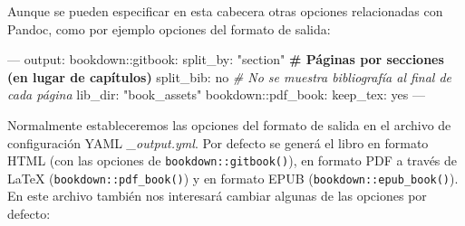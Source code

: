\documentclass[]{book}
\newenvironment{Shaded}{\begin{snugshade}}{\end{snugshade}}
\newcommand{\KeywordTok}[1]{\textcolor[rgb]{0.13,0.29,0.53}{\textbf{#1}}}
\newcommand{\StringTok}[1]{\textcolor[rgb]{0.31,0.60,0.02}{#1}}
\newcommand{\CommentTok}[1]{\textcolor[rgb]{0.56,0.35,0.01}{\textit{#1}}}
\newcommand{\OtherTok}[1]{\textcolor[rgb]{0.56,0.35,0.01}{#1}}
\newcommand{\FunctionTok}[1]{\textcolor[rgb]{0.00,0.00,0.00}{#1}}
\newcommand{\AttributeTok}[1]{\textcolor[rgb]{0.77,0.63,0.00}{#1}}
\newcommand{\ErrorTok}[1]{\textcolor[rgb]{0.64,0.00,0.00}{\textbf{#1}}}
\newcommand{\NormalTok}[1]{#1}
\theoremstyle{definition}
\theoremstyle{definition}
\theoremstyle{definition}
\theoremstyle{remark}
\begin{document}
Aunque se pueden especificar en esta cabecera otras opciones
relacionadas con Pandoc, como por ejemplo opciones del formato de
salida:

\begin{Shaded}
\begin{Highlighting}[]
\OtherTok{---}
\FunctionTok{output:}
  \FunctionTok{bookdown:}\AttributeTok{:gitbook:}
    \FunctionTok{split_by:}\AttributeTok{ }\StringTok{"section"}\ErrorTok{       # Páginas por secciones (en lugar de capítulos)}
    \FunctionTok{split_bib:}\AttributeTok{ no             }\CommentTok{# No se muestra bibliografía al final de cada página}
    \FunctionTok{lib_dir:}\AttributeTok{ }\StringTok{"book_assets"}
  \FunctionTok{bookdown:}\AttributeTok{:pdf_book:}
    \FunctionTok{keep_tex:}\AttributeTok{ yes}
\OtherTok{---}
\end{Highlighting}
\end{Shaded}

Normalmente estableceremos las opciones del formato de salida en el
archivo de configuración YAML \emph{\_output.yml}. Por defecto se generá
el libro en formato HTML (con las opciones de
\texttt{bookdown::gitbook()}), en formato PDF a través de LaTeX
(\texttt{bookdown::pdf\_book()}) y en formato EPUB
(\texttt{bookdown::epub\_book()}). En este archivo también nos
interesará cambiar algunas de las opciones por defecto:

\begin{Shaded}
\end{Shaded}
\end{document}
